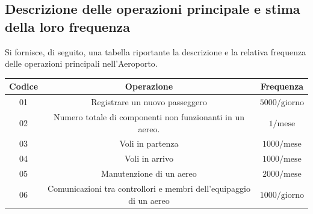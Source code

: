 
\newpage

\subsection{Descrizione delle operazioni principale e stima della loro frequenza}

\textsf{\small Si fornisce, di seguito, una tabella riportante la descrizione e la relativa frequenza delle operazioni principali nell'Aeroporto.}\\

\begin{tabular}{ | c c c |} 
	\hline
	\rowcolor{airforceblue}
	\textbf{\color{white}Codice} & \textbf{\color{white}Operazione} & \textbf{\color{white}Frequenza} \\
	\hline
	\textsf{\small 01} & \textsf{\small Registrare un nuovo passeggero} & \textsf{\small $5000/\text{giorno}$} \\ %
	\hline
	\textsf{\small 02} & \textsf{\small  Numero totale di componenti non funzionanti in un aereo.} & \textsf{\small $ 1/\text{mese} $} \\ 
	\hline
	\textsf{\small 03} & \textsf{\small Voli in partenza} & \textsf{\small $ 1000 / \text{mese} $} \\
	\hline
	\textsf{\small 04} & \textsf{\small Voli in arrivo} & \textsf{\small $ 1000 / \text{mese} $} \\
	\hline
	\textsf{\small 05} & \textsf{\small Manutenzione di un aereo} & \textsf{\small $ 2000 / \text{mese} $} \\
	\hline
	\textsf{\small 06} & \textsf{\small Comunicazioni tra controllori e membri dell'equipaggio di un aereo} & \textsf{\small $ 1000 / \text{giorno} $} \\
	

\end{tabular}

